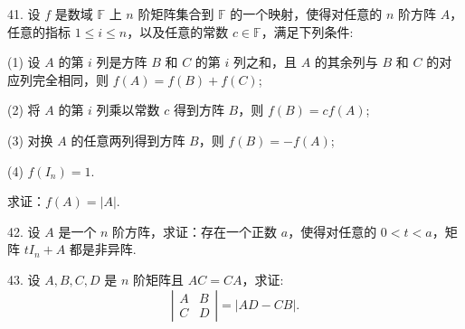 \documentclass[UTF8,12pt,a4paper,fontset=fandol]{ctexart}
\begin{document}
41. 设 $f$ 是数域 $\mathbb{F}$ 上 $n$ 阶矩阵集合到 $\mathbb{F}$ 的一个映射，使得对任意的 $n$ 阶方阵 $A$，任意的指标 $1\leq i\leq n$，以及任意的常数 $c\in\mathbb{F}$，满足下列条件:

(1) 设 $A$ 的第 $i$ 列是方阵 $B$ 和 $C$ 的第 $i$ 列之和，且 $A$ 的其余列与 $B$ 和 $C$ 的对应列完全相同，则 $f(A)=f(B)+f(C)$;

(2) 将 $A$ 的第 $i$ 列乘以常数 $c$ 得到方阵 $B$，则 $f(B)=cf(A)$;

(3) 对换 $A$ 的任意两列得到方阵 $B$，则 $f(B)=-f(A)$;

(4) $f(I_n)=1$.

求证：$f(A)=|A|$.

42. 设 $A$ 是一个 $n$ 阶方阵，求证：存在一个正数 $a$，使得对任意的 $0<t<a$，矩阵 $tI_n+A$ 都是非异阵.

43. 设 $A,B,C,D$ 是 $n$ 阶矩阵且 $AC=CA$，求证:
\[
\left|\begin{array}{cc}
A & B\\
C & D
\end{array}\right|=|AD-CB|.
\]
\end{document}
